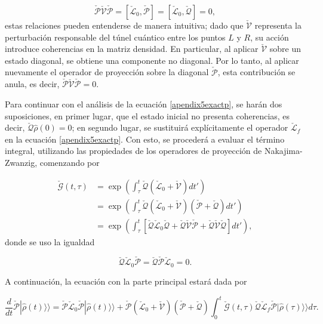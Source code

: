 \begin{appendixs}
\begin{equation*}
    \check{\mathcal{P}}\check{\mathcal{V}}\check{\mathcal{P}} = [\check{\mathcal{L}}_0,\check{\mathcal{P}}] = [\check{\mathcal{L}}_0,\check{\mathcal{Q}}] = 0, 
\end{equation*}
estas relaciones pueden entenderse de manera intuitiva; dado que $\check{\mathcal{V}}$ representa la perturbación responsable del túnel cuántico entre los puntos $L$ y $R$, su acción introduce coherencias en la matriz densidad. En particular, al aplicar $\check{\mathcal{V}}$ sobre un estado diagonal, se obtiene una componente no diagonal. Por lo tanto, al aplicar nuevamente el operador de proyección sobre la diagonal $\check{\mathcal{P}}$, esta contribución se anula, es decir, $\check{\mathcal{P}} \check{\mathcal{V}} \check{\mathcal{P}} = 0$.

Para continuar con el análisis de la ecuación \ref{apendix5exactp}, se harán dos suposiciones, en primer lugar, que el estado inicial no presenta coherencias, es decir, $\check{\mathcal{Q}}\hat{\rho}(0) = 0$; en segundo lugar, se sustituirá explícitamente el operador $\check{\mathcal{L}}_f$ en la ecuación \ref{apendix5exactp}. Con esto, se procederá a evaluar el término integral, utilizando las propiedades de los operadores de proyección de Nakajima-Zwanzig, comenzando por

\begin{align*}
    \check{\mathcal{G}}(t,\tau) & = \exp\left(  \int_{\tau}^{t}\check{\mathcal{Q}}(\check{\mathcal{L}}_{0} + \check{\mathcal{V}})dt' \right) \\
        & = \exp\left(  \int_{\tau}^{t}\check{\mathcal{Q}}(\check{\mathcal{L}}_{0}+\check{\mathcal{V}})(\check{\mathcal{P}}+\check{\mathcal{Q}}) dt' \right) \\
            & = \exp\left(  \int_{\tau}^{t}\left[\check{\mathcal{Q}}\check{\mathcal{L}}_{0}\check{\mathcal{Q}}+ \check{\mathcal{Q}}\check{\mathcal{V}}\check{\mathcal{P}}+\check{\mathcal{Q}}\check{\mathcal{V}}\check{\mathcal{Q}}\right] dt' \right),       
\end{align*}
donde se uso la igualdad

\begin{equation*}
    \check{\mathcal{Q}}\check{\mathcal{L}}_{0}\check{\mathcal{P}} = \check{\mathcal{Q}}\check{\mathcal{P}}\check{\mathcal{L}}_{0}= 0.
\end{equation*}

A continuación, la ecuación con la parte principal estará dada por 

\begin{equation*}
    \frac{d}{dt}\check{\mathcal{P}}|\hat{\rho}(t)\rangle \rangle = \check{\mathcal{P}}\check{\mathcal{L}}_{0}\check{\mathcal{P}}|\hat{\rho}(t)\rangle \rangle + \check{\mathcal{P}}(\check{\mathcal{L}}_{0} + \check{\mathcal{V}})(\check{\mathcal{P}}+\check{\mathcal{Q}})\int_{0}^{t}\check{\mathcal{G}}(t,\tau)\check{\mathcal{Q}}\check{\mathcal{L}}_{f} \check{\mathcal{P}}|\hat{\rho}(\tau)\rangle \rangle d\tau.       
\end{equation*}


\end{appendixs}

